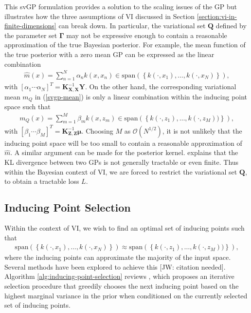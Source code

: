 \documentclass{article}
\newcommand{\jw}[1]{{\color{gray} [JW: #1]}}
\numberwithin{equation}{section}
\begin{document}
This svGP formulation provides a solution to the scaling issues of the GP but illustrates how the three assumptions of VI discussed in Section \ref{section:vi-in-finite-dimensions} can break down. 
In particular, the variational set $\mathbf{Q}$ defined by the parameter set $\boldsymbol{\Gamma}$ may not be expressive enough to contain a reasonable approximation of the true Bayesian posterior. 
For example, the mean function of the true posterior with a zero mean GP can be expressed as the linear combination
\begin{align}
    \hat{m}(x) = \sum_{n=1}^{N} \alpha_n k(x, x_n) \in \text{span} \left(\left\{k(\cdot, x_1), \dots, k(\cdot, x_N)\right\}\right),
\end{align}
with $\left[\alpha_1 \cdots \alpha_N\right]^T = \mathbf{K}_{\mathbf{X}, \mathbf{X}}^{-1}\mathbf{Y}$.
On the other hand, the corresponding variational mean $m_Q$ in (\ref{svgp-mean}) is only a linear combination within the inducing point space such that
\begin{align}
    m_Q(x) = \sum_{m=1}^{M} \beta_m k(x, z_m) \in \text{span}\left(\left\{k(\cdot, z_1), \dots, k(\cdot, z_M))\right\}\right),
\end{align}
with $\left[\beta_1 \cdots \beta_M\right]^T = \mathbf{K}_{\mathbf{Z}, \mathbf{Z}}^{-1}\boldsymbol{\mu}$.
Choosing $M$ as $\mathcal{O}(N^{1/2})$, it is not unlikely that the inducing point space will be too small to contain a reasonable approximation of $\hat{m}$. 
A similar argument can be made for the posterior kernel. 
\cite{wild2022generalized} explains that the KL divergence between two GPs is not generally tractable or even finite. 
Thus within the Bayesian context of VI, we are forced to restrict the variational set $\boldsymbol{Q}$, to obtain a tractable loss $L$.

\subsection{Inducing Point Selection}\label{section:inducing-point-selection}
Within the context of VI, we wish to find an optimal set of inducing points such that
\begin{align}
    \text{span} \left(\left\{k(\cdot, x_1), \dots, k(\cdot, x_N)\right\}\right) \approx \text{span}\left(\left\{k(\cdot, z_1), \dots, k(\cdot, z_M))\right\}\right),
\end{align}
where the inducing points can approximate the majority of the input space. Several methods have been explored to achieve this \jw{citation needed}. 
Algorithm \ref{alg:inducing-point-selection} reviews \cite{burt2020convergence}, which proposes an iterative selection procedure that greedily chooses the next inducing point based on the highest marginal variance in the prior when conditioned on the currently selected set of inducing points.
\end{document}
